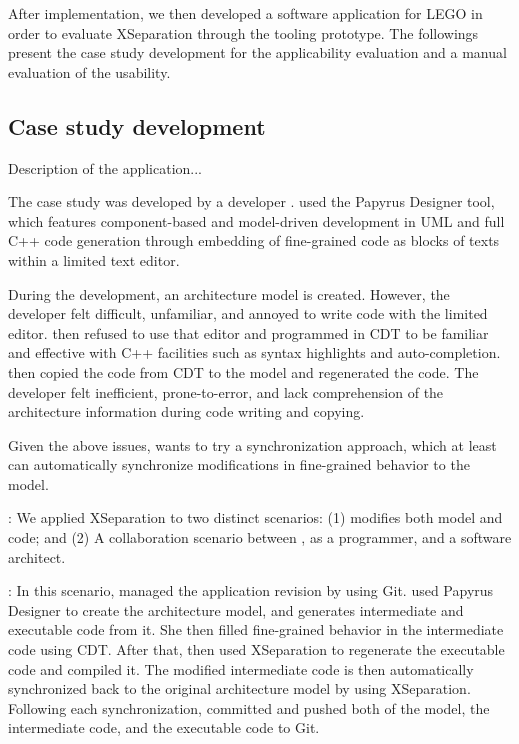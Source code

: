 After implementation, we then developed a software application for LEGO in order to evaluate XSeparation through the tooling prototype.
The followings present the case study development for the applicability evaluation and a manual evaluation of the usability.

\subsection{Case study development}
Description of the application...

The case study was developed by a developer . 
 used the Papyrus Designer tool, which features component-based and model-driven development in UML and full C++ code generation through embedding of fine-grained code as blocks of texts within a limited text editor.   

During the development, an architecture model is created.
However, the developer felt difficult, unfamiliar, and annoyed to write code with the limited editor.
 then refused to use that editor and programmed in CDT to be familiar and effective with C++ facilities such as syntax highlights and auto-completion.
 then copied the code from CDT to the model and regenerated the code.
The developer felt inefficient, prone-to-error, and lack comprehension of the architecture information during code writing and copying.

Given the above issues,  wants to try a synchronization approach, which at least can automatically synchronize modifications in fine-grained behavior to the model.

\vskip 0.1cm
\noindent
{}:
We applied XSeparation to two distinct scenarios: (1)  modifies both model and code; and (2) A collaboration scenario between , as a programmer, and a software architect. 

\vskip 0.1cm
\noindent
{}:
In this scenario,  managed the application revision by using Git.
 used Papyrus Designer to create the architecture model, and generates intermediate and executable code from it.
She then filled fine-grained behavior in the intermediate code using CDT.
After that,  then used XSeparation to regenerate the executable code and compiled it.
The modified intermediate code is then automatically synchronized back to the original architecture model by using XSeparation.
Following each synchronization,  committed and pushed both of the model, the intermediate code, and the executable code to Git.  

